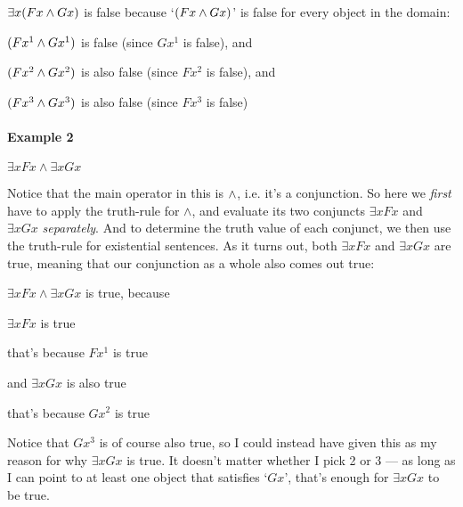 \begin{etriangle}
\item $\exists x(Fx \wedge Gx)$ is false because `$(Fx \wedge Gx)$' is false for every object in the domain:
\begin{etriangle}
\item $(Fx^1 \wedge Gx^1)$ is false (since $Gx^1$ is false), and
\item $(Fx^2 \wedge Gx^2)$ is also false (since $Fx^2$ is false), and
\item $(Fx^3 \wedge Gx^3)$ is also false (since $Fx^3$ is false)
\end{etriangle}
\end{etriangle}

\paragraph{Example 2} $\exists x Fx \land \exists x Gx$

\noindent Notice that the main operator in this is $\wedge$, i.e. it's a conjunction.  So here we \emph{first} have to apply the truth-rule for $\land$, and evaluate its two conjuncts $\exists xFx$ and $\exists xGx$ \emph{separately}.  And to determine the truth value of each conjunct, we then use the truth-rule for existential sentences.    As it turns out, both $\exists xFx$ and $\exists xGx$ are true, meaning that our conjunction as a whole also comes out true:
\begin{etriangle}
\item $\exists x Fx \land \exists x Gx$ is true, because
\begin{etriangle}
\item $\exists xFx$ is true
\begin{etriangle}
\item that's because $Fx^1$ is true
\end{etriangle}
\item and $\exists xGx$ is also true
 \begin{etriangle}
 \item that's because $Gx^2$ is true
\end{etriangle}
\end{etriangle}
\end{etriangle}
Notice that $Gx^3$ is of course also true, so I could instead have given this as my reason for why $\exists xGx$  is true.   It doesn't matter whether I pick 2 or 3 --- as long as I can point to at least one object that satisfies `$Gx$', that's enough for $\exists xGx$ to be true.

